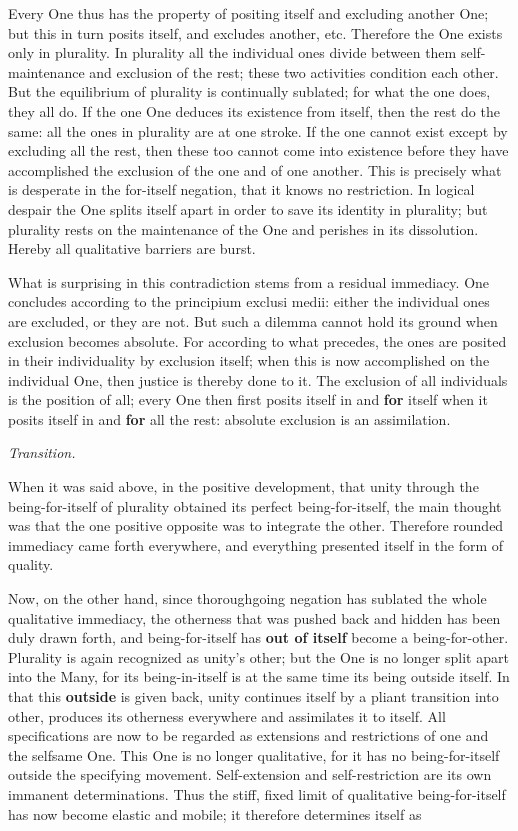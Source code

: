 \documentclass[12pt,a4paper,openany]{book}
\newcommand{\opage}[1]{\marginnote{\footnotesize\textit{[#1]}}}
\newcommand{\overgang}{\begin{center}\emph{Transition.}\end{center}}
\begin{document}
Every One thus has the property of positing itself
and excluding another One; but this in turn posits
itself, and excludes another, etc. Therefore the One exists
only in plurality. In plurality all the
individual ones divide between them self-maintenance and exclusion
of the rest; these two activities condition
each other. But the equilibrium of plurality is continually sublated;
for what the one does, they all do. If the one One deduces its existence from itself, then
the rest do the same: all the ones in plurality are
at one stroke. If the one cannot exist except by
excluding all the rest, then these too cannot
\setcounter{footnote}{0}%
\opage{24}come into existence before they have accomplished the exclusion of
the one and of one another. This is precisely
what is desperate in the for-itself negation, that it
knows no restriction. In logical despair
the One splits itself apart in order to save its identity
in plurality; but plurality rests on the maintenance
of the One and perishes in its dissolution. Hereby
all qualitative barriers are burst.

What is surprising in this contradiction stems from
a residual immediacy. One concludes according to the principium exclusi medii: either the individual ones are excluded,
or they are not. But such a dilemma cannot hold its ground when exclusion becomes absolute. For according to what precedes, the ones are posited
in their individuality by exclusion itself; when this
is now accomplished on the individual One, then justice is thereby done
to it. The exclusion of all individuals is the position of all;
every One then first posits itself in and \textbf{for} itself
when it posits itself in and \textbf{for} all the rest: absolute
exclusion is an assimilation.

\overgang

When it was said above, in the positive development, that
unity through the being-for-itself of plurality obtained
its perfect being-for-itself, the main thought was
that the one positive opposite was to integrate
the other. Therefore rounded immediacy came forth
everywhere, and everything presented itself in the form of
quality.

Now, on the other hand, since thoroughgoing negation has sublated
the whole qualitative immediacy, the otherness that was pushed back
and hidden has been duly drawn forth,
and being-for-itself has \textbf{out of itself} become a being-for-other. Plurality is again recognized as unity's
\setcounter{footnote}{0}%
\opage{25}other; but the One is no longer split apart into the Many,
for its being-in-itself is at the same time its being outside
itself. In that this \textbf{outside} is given back, unity
continues itself by a pliant transition into
other, produces its otherness everywhere and assimilates
it to itself. All specifications are now to be regarded
as extensions and restrictions of one and the
selfsame One. This One is no longer qualitative, for
it has no being-for-itself outside the specifying
movement. Self-extension and self-restriction are
its own immanent determinations. Thus the
stiff, fixed limit of qualitative being-for-itself has now
become elastic and mobile; it therefore determines itself
as
\end{document}

